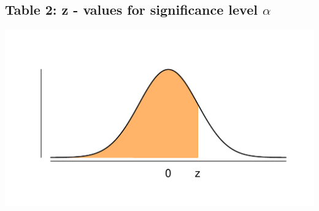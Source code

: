 \subsection{Table 2: z - values for significance level $\alpha$}
\label{table2}

\vspace*{-30pt}
\begin{minipage}{0.6\textwidth}
\hfill
\end{minipage}
\begin{minipage}{0.4\textwidth}
\includegraphics[width=\textwidth]{Files/Images/Normal.pdf}
\end{minipage}


